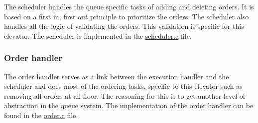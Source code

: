 The scheduler handles the queue specific tasks of adding and deleting orders. It is based on a first in, first out principle to prioritize the orders. The scheduler also handles all the logic of validating the orders. This validation is specific for this elevator. The scheduler is implemented in the \hyperlink{scheduler_8c_source}{scheduler.\+c} file.\hypertarget{index_order}{}\subsubsection{Order handler}\label{index_order}
The order handler serves as a link between the execution handler and the scheduler and does most of the ordering tasks, specific to this elevator such as removing all orders at all floor. The reasoning for this is to get another level of abstraction in the queue system. The implementation of the order handler can be found in the \hyperlink{order_8c_source}{order.\+c} file. 